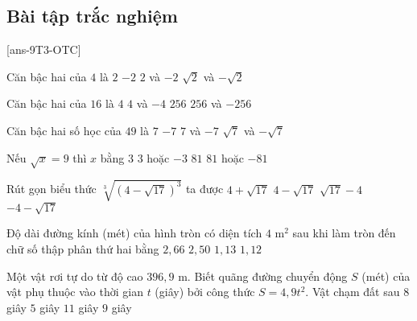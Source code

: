 \subsection{Bài tập trắc nghiệm}
[ans-9T3-OTC]
\begin{ex}
	Căn bậc hai của $4$ là
	\choice
	{$2$}
	{$-2$}
	{\True $2$ và $-2$}
	{$\sqrt{2}$ và $-\sqrt{2}$}
\end{ex}
\begin{ex}%
	Căn bậc hai của $16$ là
	\choice
	{$4$}
	{\True $4$ và $-4$}
	{$256$}
	{$256$ và $-256$}
\end{ex}
\begin{ex}
	Căn bậc hai số học của $49$ là
	\choice
	{\True $7$}
	{$-7$}
	{$7$ và $-7$}
	{$\sqrt{7}$ và $-\sqrt{7}$}
\end{ex}
\begin{ex}%
	Nếu $\sqrt{x} = 9$ thì $x$ bằng
	\choice 
	{$3$}
	{$3$ hoặc $-3$}
	{$81$}
	{$81$ hoặc $-81$}
\end{ex}
\begin{ex}
	Rút gọn biểu thức $\sqrt[3]{\left(4-\sqrt{17}\right)^3}$ ta được	
	\choice
	{$4+\sqrt{17}$}
	{\True $4-\sqrt{17}$}
	{$\sqrt{17}-4$}
	{$-4-\sqrt{17}$}
\end{ex}
\begin{ex}
	Độ dài đường kính (mét) của hình tròn có diện tích $4$ m$^2$ sau khi làm tròn đến chữ số thập phân thứ hai bằng
	\choice
	{\True $2{,}66$}
	{$2{,}50$}
	{$1{,}13$}
	{$1{,}12$}
\end{ex}
\begin{ex}
	Một vật rơi tự do từ độ cao $396{,}9$ m. Biết quãng đường chuyển động $S$ (mét) của vật phụ thuộc vào thời gian $t$ (giây) bởi công thức $S=4{,}9t^2$. Vật chạm đất sau
	\choice
	{$8$ giây}
	{$5$ giây}
	{$11$ giây}
	{\True $9$ giây}
\end{ex}
